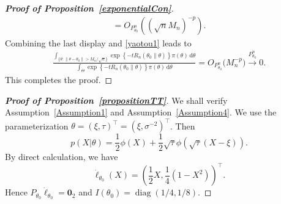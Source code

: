 \documentclass[11pt]{article}
\DeclareMathOperator{\mydiag}{diag}
\theoremstyle{plain}
\theoremstyle{definition}
\theoremstyle{remark}
\begin{document}
\begin{appendices}
\begin{proof}[\textbf{Proof of Proposition~\ref{exponentialCon}}]
\begin{align*}
=O_{P^n_{\theta_0}}( (\sqrt n M_n)^{-p} ).
\end{align*}
Combining the last display and \eqref{yaotou1} leads to
$$
    \begin{aligned}
        \frac{
\int_{\{\theta:\|\theta-\theta_0\|> M_n/\sqrt{n}\}} \exp\left\{ -t R_n (\theta_0 \| \theta) \right\} \pi(\theta) \, \mathrm d \theta
        }
        {
\int_{\Theta} \exp\left\{ -t R_n (\theta_0 \| \theta) \right\} \pi(\theta) \, \mathrm d \theta
        }
        =
        O_{P_{\theta_0}^n}
        \Big(
            M_n^{-p}
        \Big)
        \xrightarrow{P^n_{\theta_0}} 0.
    \end{aligned}
$$
This completes the proof.

\end{proof}



\begin{proof}[\textbf{Proof of Proposition~\ref{propositionTT}}]
We shall verify Assumption~\ref{Assumption1} and Assumption~\ref{Assumption4}.
We use the parameterization
$
\theta=(\xi,\tau)^\top  =(\xi,\sigma^{-2})^\top $.
Then
\begin{equation*}
    p(X|\theta)=\frac{1}{2}\phi(X)+\frac{1}{2}\sqrt{\tau} \phi(\sqrt{\tau}(X-\xi)).
\end{equation*}
By direct calculation, we have 
\begin{equation*}
    \dot{\ell}_{\theta_0}(X)=\left(\frac{1}{2}X,\frac{1}{4}(1-X^2)\right)^\top .
\end{equation*}
Hence $P_{\theta_0}\dot{\ell}_{\theta_0}=\mathbf{0}_2$ and
$I(\theta_0) = \mydiag (1/4, 1/8)$.


\end{proof}
\end{appendices}
\end{document}
